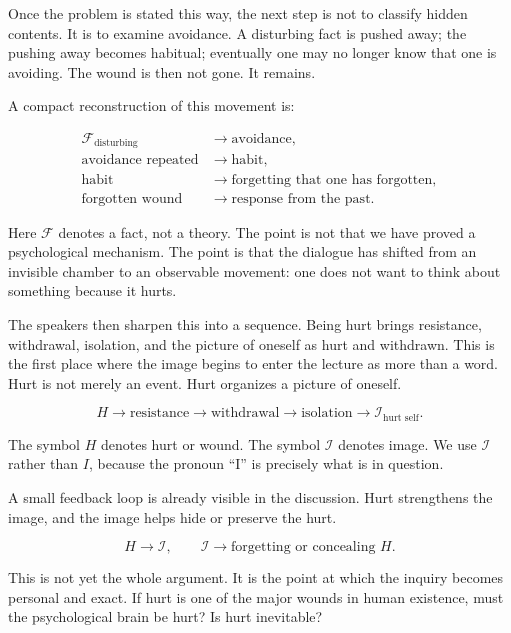 Once the problem is stated this way, the next step is not to classify hidden contents. It is to examine avoidance. A disturbing fact is pushed away; the pushing away becomes habitual; eventually one may no longer know that one is avoiding. The wound is then not gone. It remains.

A compact reconstruction of this movement is:

\begin{align}
\mathcal{F}_{\text{disturbing}}
&\to \text{avoidance}, \\
\text{avoidance repeated}
&\to \text{habit}, \\
\text{habit}
&\to \text{forgetting that one has forgotten}, \\
\text{forgotten wound}
&\to \text{response from the past}.
\end{align}

Here \(\mathcal{F}\) denotes a fact, not a theory. The point is not that we have proved a psychological mechanism. The point is that the dialogue has shifted from an invisible chamber to an observable movement: one does not want to think about something because it hurts.

The speakers then sharpen this into a sequence. Being hurt brings resistance, withdrawal, isolation, and the picture of oneself as hurt and withdrawn. This is the first place where the image begins to enter the lecture as more than a word. Hurt is not merely an event. Hurt organizes a picture of oneself.

\begin{equation}
H \to \text{resistance} \to \text{withdrawal} \to \text{isolation} \to \mathcal{I}_{\text{hurt self}}.
\end{equation}

The symbol \(H\) denotes hurt or wound. The symbol \(\mathcal{I}\) denotes image. We use \(\mathcal{I}\) rather than \(I\), because the pronoun ``I'' is precisely what is in question.

A small feedback loop is already visible in the discussion. Hurt strengthens the image, and the image helps hide or preserve the hurt.

\begin{equation}
H \to \mathcal{I},
\qquad
\mathcal{I} \to \text{forgetting or concealing }H.
\end{equation}

This is not yet the whole argument. It is the point at which the inquiry becomes personal and exact. If hurt is one of the major wounds in human existence, must the psychological brain be hurt? Is hurt inevitable?

